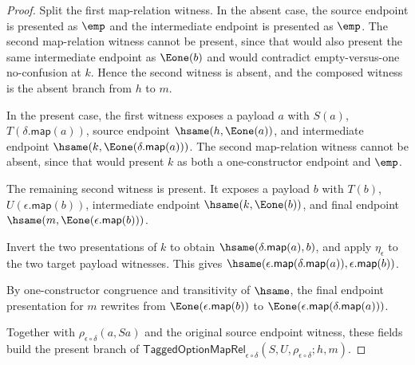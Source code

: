 \begin{proof}
Split the first map-relation witness. In the absent case, the source endpoint
is presented as $\emp$ and the intermediate endpoint is presented as $\emp$.
The second map-relation witness cannot be present, since that would also
present the same intermediate endpoint as $\Eone(b)$ and would contradict
empty-versus-one no-confusion at $k$. Hence the second witness is absent, and
the composed witness is the absent branch from $h$ to $m$.

In the present case, the first witness exposes a payload $a$ with $S(a)$,
$T(\delta.\mathsf{map}(a))$, source endpoint
$\hsame(h,\Eone(a))$, and intermediate endpoint
$\hsame(k,\Eone(\delta.\mathsf{map}(a)))$. The second map-relation witness
cannot be absent, since that would present $k$ as both a one-constructor
endpoint and $\emp$.

The remaining second witness is present. It exposes a payload $b$ with $T(b)$,
$U(\epsilon.\mathsf{map}(b))$, intermediate endpoint $\hsame(k,\Eone(b))$, and
final endpoint $\hsame(m,\Eone(\epsilon.\mathsf{map}(b)))$.

Invert the two presentations of $k$ to obtain
$\hsame(\delta.\mathsf{map}(a),b)$, and apply $\eta_{\epsilon}$ to the two
target payload witnesses. This gives
$\hsame(\epsilon.\mathsf{map}(\delta.\mathsf{map}(a)),
\epsilon.\mathsf{map}(b))$.

By one-constructor congruence and transitivity of $\hsame$, the final endpoint
presentation for $m$ rewrites from $\Eone(\epsilon.\mathsf{map}(b))$ to
$\Eone(\epsilon.\mathsf{map}(\delta.\mathsf{map}(a)))$.

Together with $\rho_{\epsilon\circ\delta}(a,Sa)$ and the original source
endpoint witness, these fields build the present branch of
$\mathsf{TaggedOptionMapRel}_{\epsilon\circ\delta}
(S,U,\rho_{\epsilon\circ\delta};h,m)$.
\end{proof}

